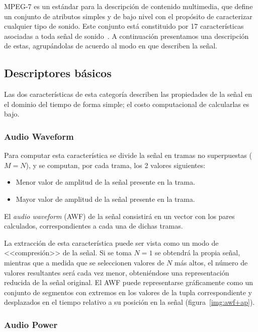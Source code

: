 MPEG-7 es un estándar para la descripción de contenido multimedia, que define un conjunto de atributos simples y de bajo nivel con el propósito de caracterizar cualquier tipo de sonido.
Este conjunto está constituido por 17 características asociadas a toda señal de sonido~\cite{Kim05,Manjunath02}.
A continuación presentamos una descripción de estas, agrupándolas de acuerdo al modo en que describen la señal.

\subsection{Descriptores básicos}\label{subsec:descriptoresBásicos}

Las dos características de esta categoría describen las propiedades de la señal en el dominio del tiempo de forma simple;
el costo computacional de calcularlas es bajo.

\subsubsection{Audio Waveform}

Para computar esta característica se divide la señal en tramas no superpuestas ($M = N$), y se computan, por cada trama, los 2 valores siguientes:

\begin{itemize}
    \item Menor valor de amplitud de la señal presente en la trama.
    \item Mayor valor de amplitud de la señal presente en la trama.
\end{itemize}

El \textit{audio waveform} (AWF) de la señal consistirá en un vector con los pares calculados, correspondientes a cada una de dichas tramas.

La extracción de esta característica puede ser vista como un modo de <<compresión>> de la señal.
Si se toma $N=1$ se obtendrá la propia señal, mientras que a medida que se seleccionen valores de $N$ más altos, el número de valores resultantes será cada vez menor, obteniéndose una representación reducida de la señal original.
El AWF puede representarse gráficamente como un conjunto de segmentos con extremos en los valores de la tupla correspondiente y desplazados en el tiempo relativo a su posición en la señal (figura~\ref{img:awf+ap}).

\subsubsection{Audio Power}

